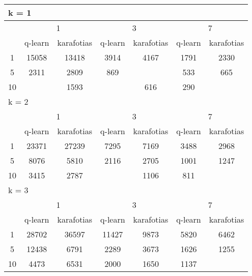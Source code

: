 \begin{table}
\begin{tabular}{|*7{c|}}
\hline
\multicolumn{7}{|l|}{k = 1} \\
\hline
\multirow{2}{*}{\diagbox{$\mu$}{$\lambda$}} & \multicolumn{2}{c|}{1} & \multicolumn{2}{c|}{3} & \multicolumn{2}{c|}{7} \\
\cline{2-7}
 & q-learn & karafotias & q-learn & karafotias & q-learn & karafotias \\
\hline
1 & 15058 & 13418 & 3914 & 4167 & 1791 & 2330 \\
\hline
5 & 2311 & 2809 & 869& \cellcolor{olive}{748} & 533 & 665 \\
\hline
10& \cellcolor{olive}{1497} & 1593& \cellcolor{olive}{488} & 616 & 290& \cellcolor{olive}{235} \\
\hline
\multicolumn{7}{|l|}{k = 2} \\
\hline
\multirow{2}{*}{\diagbox{$\mu$}{$\lambda$}} & \multicolumn{2}{c|}{1} & \multicolumn{2}{c|}{3} & \multicolumn{2}{c|}{7} \\
\cline{2-7}
 & q-learn & karafotias & q-learn & karafotias & q-learn & karafotias \\
\hline
1 & 23371 & 27239 & 7295 & 7169 & 3488 & 2968 \\
\hline
5 & 8076 & 5810 & 2116 & 2705 & 1001 & 1247 \\
\hline
10 & 3415 & 2787& \cellcolor{olive}{1037} & 1106 & 811& \cellcolor{olive}{666} \\
\hline
\multicolumn{7}{|l|}{k = 3} \\
\hline
\multirow{2}{*}{\diagbox{$\mu$}{$\lambda$}} & \multicolumn{2}{c|}{1} & \multicolumn{2}{c|}{3} & \multicolumn{2}{c|}{7} \\
\cline{2-7}
 & q-learn & karafotias & q-learn & karafotias & q-learn & karafotias \\
\hline
1 & 28702 & 36597 & 11427 & 9873 & 5820 & 6462 \\
\hline
5 & 12438 & 6791 & 2289 & 3673 & 1626 & 1255 \\
\hline
10 & 4473 & 6531 & 2000 & 1650 & 1137& \cellcolor{olive}{1098} \\
\hline
\end{tabular}
\end{table}

